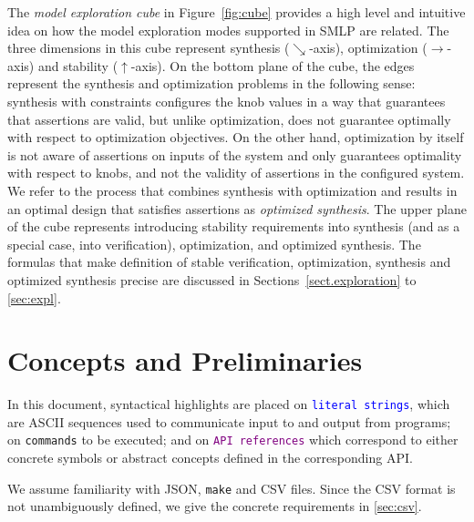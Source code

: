 \documentclass[a4paper,parskip=half]{article} %
\newcommand*\cmdstyle\texttt
\newcommand*\literalColor{blue}
\newcommand*\cmd[1]{\cmdstyle{\textcolor{red!85!black}{#1}}}
\newcommand*\literal[1]{\textcolor{\literalColor}{\cmdstyle{#1}}}
\newcommand*\api[1]{\textcolor{purple}{\cmdstyle{#1}}}
\newcommand\removed[1]{}
\newcommand\added[1]{#1}
\newcommand\changedto[2]{%
    \removed{#1}%
    \added{#2}}
\newcommand\changed[1]{{\color{blue}#1}}
\newcommand*\todofb[2][]{\todo[color=cyan!30,tickmarkheight=.2em,size=\scriptsize,#1]{FB: #2}}
\newcommand\todozk[1]{\textcolor{red}{#1}}
\begin{document}
The \emph{model exploration cube} in Figure~\ref{fig:cube} provides a high level and intuitive idea on how the model exploration modes supported in SMLP are related.
The three dimensions in this cube represent synthesis ($\searrow$-axis), optimization ($\rightarrow$-axis) and stability ($\uparrow$-axis).
On the bottom plane of the cube, the edges represent the synthesis and optimization problems in the following sense:
synthesis with constraints configures the knob values in a way that guarantees that assertions are valid, but unlike optimization, does not guarantee optimally with respect to optimization objectives.
On the other hand, optimization by itself is not aware of assertions on inputs of the system and only guarantees optimality with respect to knobs, and not the validity of assertions in the configured system.
We refer to the process that combines synthesis with optimization and results in an optimal design that satisfies assertions as \emph{optimized synthesis}.
The upper plane of the cube represents introducing stability requirements into synthesis (and as a special case, into verification), optimization, and optimized synthesis.
The formulas that make definition of stable verification, optimization, synthesis and optimized synthesis precise are discussed in \changedto{Section~\ref{sect.exploration}}{Sections~\ref{sect.exploration} to \ref{sec:expl}}.

\section{Concepts and Preliminaries}
In this document, syntactical highlights are placed on
\literal{literal strings}, which are ASCII sequences used to communicate input
to and output from programs; on \cmd{commands} to be executed;
and on \api{API references} which correspond to
either concrete symbols or abstract concepts defined in the corresponding API.

We assume familiarity with JSON, \cmd{make} and CSV files. Since the CSV format
is not unambiguously defined, we give the concrete requirements in
\cref{sec:csv}.
\end{document}
